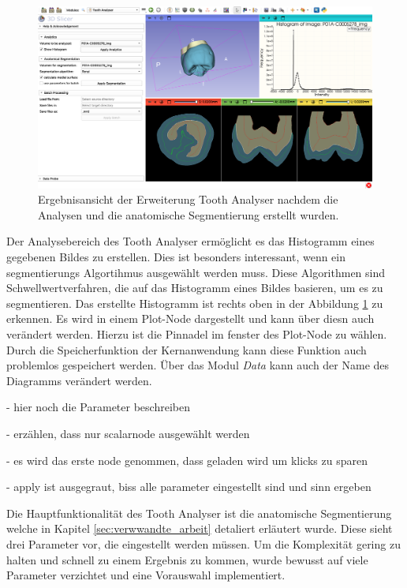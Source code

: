 \begin{figure}[h]
	\centering
	\includegraphics[scale=0.2, width=\textwidth]{img/toothAnalyserFullView.png}
	\caption{Ergebnisansicht der Erweiterung Tooth Analyser nachdem die Analysen
	und die anatomische Segmentierung erstellt wurden.}
	\label{fig:tooth_analyser_full_view}
\end{figure}

Der Analysebereich des Tooth Analyser ermöglicht es das Histogramm eines gegebenen
Bildes zu erstellen. Dies ist besonders interessant, wenn ein segmentierungs Algortihmus
ausgewählt werden muss. Diese Algorithmen sind Schwellwertverfahren, die auf das
Histogramm eines Bildes basieren, um es zu segmentieren. Das erstellte Histogramm
ist rechts oben in der Abbildung \ref{fig:tooth_analyser_full_view} zu erkennen.
Es wird in einem Plot-Node dargestellt und kann über diesn auch verändert werden.
Hierzu ist die Pinnadel im fenster des Plot-Node zu wählen. Durch die
Speicherfunktion der Kernanwendung kann diese Funktion auch problemlos
gespeichert werden. Über das Modul \textit{Data} kann auch der Name des
Diagramms verändert werden.

- hier noch die Parameter beschreiben

- erzählen, dass nur scalarnode ausgewählt werden

- es wird das erste node genommen, dass geladen wird um klicks zu sparen

- apply ist ausgegraut, biss alle parameter eingestellt sind und sinn ergeben

Die Hauptfunktionalität des Tooth Analyser ist die anatomische Segmentierung welche
in Kapitel \ref{sec:verwwandte_arbeit} detaliert erläutert wurde. Diese sieht
drei Parameter vor, die eingestellt werden müssen. Um die Komplexität gering zu
halten und schnell zu einem Ergebnis zu kommen, wurde bewusst auf viele Parameter
verzichtet und eine Vorauswahl implementiert.

